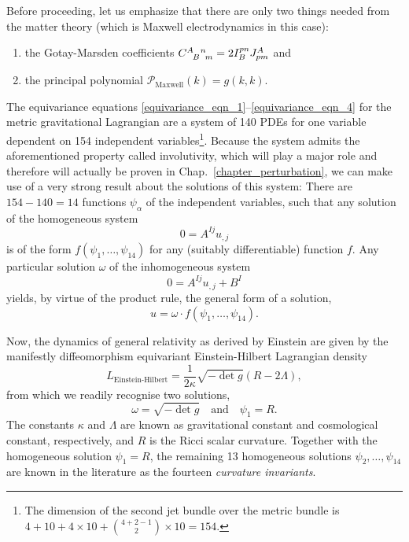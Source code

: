 Before proceeding, let us emphasize that there are only two things needed from the matter theory (which is Maxwell electrodynamics in this case):
\begin{enumerate}
  \item the Gotay-Marsden coefficients $\gmc{A}{B}{n}{m} = 2 I_B^{pn} J^A_{pm}$ and
  \item the principal polynomial $\mathcal P_\text{Maxwell}(k) = g(k,k)$.
\end{enumerate}

The equivariance equations \eqref{equivariance_eqn_1}--\eqref{equivariance_eqn_4} for the metric gravitational Lagrangian are a system of 140 PDEs for one variable dependent on 154 independent variables\footnote{The dimension of the second jet bundle over the metric bundle is $4+10+4\times 10 + \binom{4 + 2 - 1}{2}\times 10=154$.}. Because the system admits the aforementioned property called involutivity, which will play a major role and therefore will actually be proven in Chap.~\ref{chapter_perturbation}, we can make use of a very strong result about the solutions of this system\cite{seiler}: There are $154-140=14$ functions $\psi_\alpha$ of the independent variables, such that any solution of the homogeneous system
\begin{equation}
  0 = A^{Ij} u_{,j}
\end{equation}
is of the form $f(\psi_1,\dots,\psi_{14})$ for any (suitably differentiable) function $f$. Any particular solution $\omega$ of the inhomogeneous system
\begin{equation}
  0 = A^{Ij} u_{,j} + B^I
\end{equation}
yields, by virtue of the product rule, the general form of a solution,
\begin{equation}\label{general_metric_solution}
  u = \omega\cdot f(\psi_1,\dots,\psi_{14}).
\end{equation}

Now, the dynamics of general relativity as derived by Einstein are given by the manifestly diffeomorphism equivariant Einstein-Hilbert Lagrangian density
\begin{equation}\label{einstein_hilbert}
  L_\text{Einstein-Hilbert} = \frac{1}{2\kappa} \sqrt{-\operatorname{det}g}(R - 2\Lambda),
\end{equation}
from which we readily recognise two solutions,
\begin{equation}
  \omega = \sqrt{-\operatorname{det}g}\quad\text{and}\quad \psi_1 = R.
\end{equation}
The constants $\kappa$ and $\Lambda$ are known as gravitational constant and cosmological constant, respectively, and $R$ is the Ricci scalar curvature. Together with the homogeneous solution $\psi_1=R$, the remaining 13 homogeneous solutions $\psi_2,\dots,\psi_{14}$ are known in the literature as the fourteen \emph{curvature invariants}\cite{curvature_invariants}.

